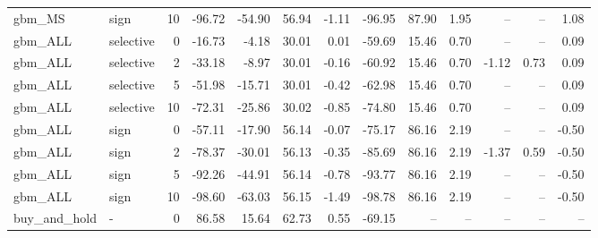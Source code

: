 \begin{tabular}{llrrrrrrrrrrr}
gbm_MS & sign & 10 & -96.72 & -54.90 & 56.94 & -1.11 & -96.95 & 87.90 & 1.95 & -- & -- & 1.08 \\
gbm_ALL & selective & 0 & -16.73 & -4.18 & 30.01 & 0.01 & -59.69 & 15.46 & 0.70 & -- & -- & 0.09 \\
gbm_ALL & selective & 2 & -33.18 & -8.97 & 30.01 & -0.16 & -60.92 & 15.46 & 0.70 & -1.12 & 0.73 & 0.09 \\
gbm_ALL & selective & 5 & -51.98 & -15.71 & 30.01 & -0.42 & -62.98 & 15.46 & 0.70 & -- & -- & 0.09 \\
gbm_ALL & selective & 10 & -72.31 & -25.86 & 30.02 & -0.85 & -74.80 & 15.46 & 0.70 & -- & -- & 0.09 \\
gbm_ALL & sign & 0 & -57.11 & -17.90 & 56.14 & -0.07 & -75.17 & 86.16 & 2.19 & -- & -- & -0.50 \\
gbm_ALL & sign & 2 & -78.37 & -30.01 & 56.13 & -0.35 & -85.69 & 86.16 & 2.19 & -1.37 & 0.59 & -0.50 \\
gbm_ALL & sign & 5 & -92.26 & -44.91 & 56.14 & -0.78 & -93.77 & 86.16 & 2.19 & -- & -- & -0.50 \\
gbm_ALL & sign & 10 & -98.60 & -63.03 & 56.15 & -1.49 & -98.78 & 86.16 & 2.19 & -- & -- & -0.50 \\
buy_and_hold & - & 0 & 86.58 & 15.64 & 62.73 & 0.55 & -69.15 & -- & -- & -- & -- & -- \\
\bottomrule
\end{tabular}
